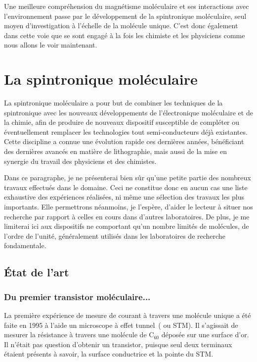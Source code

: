 Une meilleure compréhension du magnétisme moléculaire et ses interactions avec l’environnement passe par le développement de la spintronique moléculaire, seul moyen d'investigation à l'échelle de la molécule unique. C'est donc également dans cette voie que se sont engagé à la fois les chimiste et les physiciens comme nous allons le voir maintenant.


\section{La spintronique moléculaire}
La spintronique moléculaire a pour but de combiner les techniques de la spintronique avec les nouveaux développements de l'électronique moléculaire et de la chimie, afin de produire de nouveaux dispositif susceptible de compléter ou éventuellement remplacer les technologies tout semi-conducteurs déjà existantes. Cette discipline a connue une évolution rapide ces dernières années, bénéficiant des dernières avancés en matière de lithographie, mais aussi de la mise en synergie du travail des physiciens et des chimistes. 

Dans ce paragraphe, je ne présenterai bien sûr qu'une petite partie des nombreux travaux effectués dans le domaine. Ceci ne constitue donc en aucun cas une liste exhaustive des expériences réalisées, ni m\^eme une sélection des travaux les plus importants. Elle permettrons néanmoins, je l'espère, d'aider le lecteur à situer nos recherche par rapport à celles en cours dans d'autres laboratoires. De plus, je me limiterai ici aux dispositifs ne comportant qu'un nombre limités de molécules, de l'ordre de l'unité, généralement utilisés dans les laboratoires de recherche fondamentale.
\subsection{État de l'art}

\subsubsection*{Du premier transistor moléculaire...}
La première expérience de mesure de courant à travers une molécule unique a été faite en 1995 à l'aide un microscope à effet tunnel~( ou STM). Il s'agissait de mesurer la résistance à travers une molécule de C$_{60}$ déposée sur une surface d'or. Il n'était pas question d'obtenir un transistor, puisque seul deux terminaux étaient présents à savoir, la surface conductrice et la pointe du STM.

